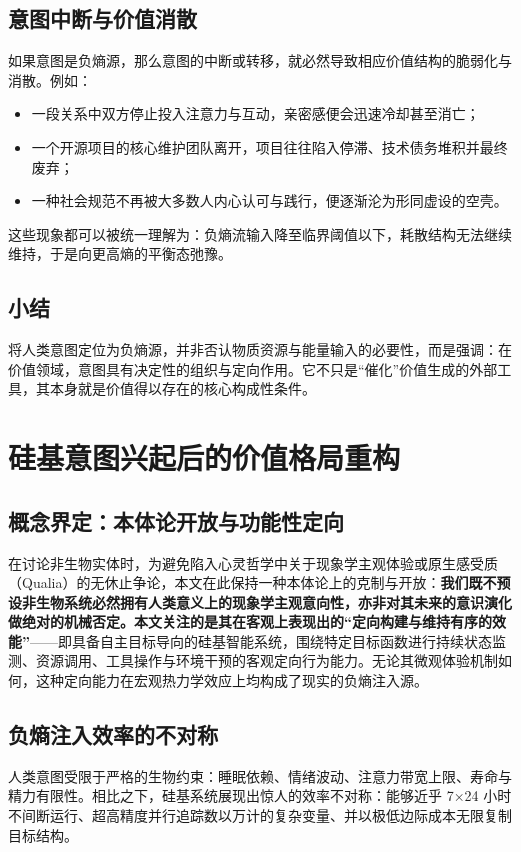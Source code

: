 \documentclass[11pt,a4paper]{ctexart}
\begin{document}
\subsection{意图中断与价值消散}
如果意图是负熵源，那么意图的中断或转移，就必然导致相应价值结构的脆弱化与消散。例如：
\begin{itemize}
    \item 一段关系中双方停止投入注意力与互动，亲密感便会迅速冷却甚至消亡；
    \item 一个开源项目的核心维护团队离开，项目往往陷入停滞、技术债务堆积并最终废弃；
    \item 一种社会规范不再被大多数人内心认可与践行，便逐渐沦为形同虚设的空壳。
\end{itemize}

这些现象都可以被统一理解为：负熵流输入降至临界阈值以下，耗散结构无法继续维持，于是向更高熵的平衡态弛豫。

\subsection{小结}
将人类意图定位为负熵源，并非否认物质资源与能量输入的必要性，而是强调：在价值领域，意图具有决定性的组织与定向作用。它不只是“催化”价值生成的外部工具，其本身就是价值得以存在的核心构成性条件。

\section{硅基意图兴起后的价值格局重构}

\subsection{概念界定：本体论开放与功能性定向}
在讨论非生物实体时，为避免陷入心灵哲学中关于现象学主观体验或原生感受质（Qualia）的无休止争论，本文在此保持一种本体论上的克制与开放：\textbf{我们既不预设非生物系统必然拥有人类意义上的现象学主观意向性，亦非对其未来的意识演化做绝对的机械否定。本文关注的是其在客观上表现出的“定向构建与维持有序的效能”}——即具备自主目标导向的硅基智能系统，围绕特定目标函数进行持续状态监测、资源调用、工具操作与环境干预的客观定向行为能力。无论其微观体验机制如何，这种定向能力在宏观热力学效应上均构成了现实的负熵注入源。

\subsection{负熵注入效率的不对称}
人类意图受限于严格的生物约束：睡眠依赖、情绪波动、注意力带宽上限、寿命与精力有限性。相比之下，硅基系统展现出惊人的效率不对称：能够近乎 7×24 小时不间断运行、超高精度并行追踪数以万计的复杂变量、并以极低边际成本无限复制目标结构。
\end{document}
